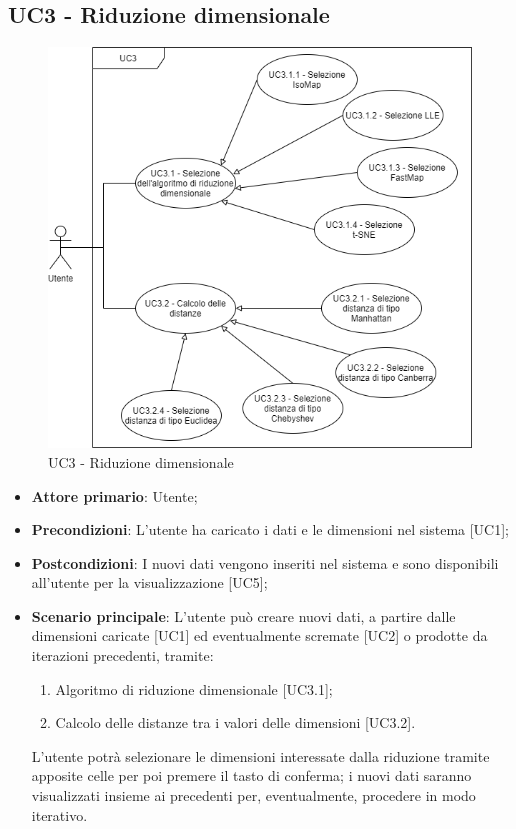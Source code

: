 \subsection{UC3 - Riduzione dimensionale}
\begin{figure}[h]
\includegraphics[width=14cm]{section/Images/UC3.png}
\centering
\caption{UC3 - Riduzione dimensionale}
\end{figure}
\begin{itemize}
	\item \textbf{Attore primario}: Utente;
	\item \textbf{Precondizioni}: L'utente ha caricato i dati e le dimensioni nel sistema [UC1];
	\item \textbf{Postcondizioni}: I nuovi dati vengono inseriti nel sistema e sono disponibili all'utente per la visualizzazione [UC5];
	\item \textbf{Scenario principale}: L'utente può creare nuovi dati, a partire dalle dimensioni caricate [UC1] ed eventualmente scremate [UC2] o prodotte da iterazioni precedenti, tramite:
	\begin{enumerate}[1.]
		\item Algoritmo di riduzione dimensionale [UC3.1];
		\item Calcolo delle distanze tra i valori delle dimensioni [UC3.2].
	\end{enumerate}
	L'utente potrà selezionare le dimensioni interessate dalla riduzione tramite apposite celle per poi premere il tasto di conferma; i nuovi dati saranno visualizzati insieme ai precedenti per, eventualmente, procedere in modo iterativo.
\end{itemize}